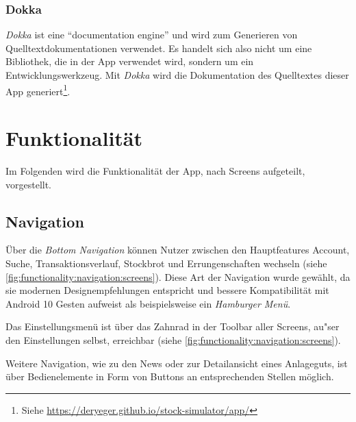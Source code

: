 \documentclass[a4paper]{article}
\begin{document}
\subsubsection{Dokka}
\label{subsubsec:technologies:bibs:dokka}
\textit{Dokka} ist eine "`documentation engine"' und wird zum Generieren von Quelltextdokumentationen verwendet.
Es handelt sich also nicht um eine Bibliothek, die in der App verwendet wird, sondern um ein Entwicklungswerkzeug.
Mit \textit{Dokka}  wird die Dokumentation des Quelltextes dieser App generiert\footnote{Siehe \url{https://deryeger.github.io/stock-simulator/app/}}.


\section{Funktionalität}
\label{sec:functionality}
Im Folgenden wird die Funktionalität der App, nach Screens aufgeteilt, vorgestellt.


\subsection{Navigation}
\label{subsec:functionality:navigation}
Über die \textit{Bottom Navigation} \autocite{bottom_navigation} können Nutzer zwischen den Hauptfeatures Account, Suche, Transaktionsverlauf, Stockbrot und Errungenschaften wechseln (siehe \autoref{fig:functionality:navigation:screens}).
Diese Art der Navigation wurde gewählt, da sie modernen Designempfehlungen entspricht und bessere Kompatibilität mit Android 10 Gesten aufweist als beispielsweise ein \textit{Hamburger Menü}.

Das Einstellungsmenü ist über das Zahnrad in der Toolbar aller Screens, au"ser den Einstellungen selbst, erreichbar (siehe \autoref{fig:functionality:navigation:screens}).

Weitere Navigation, wie zu den News oder zur Detailansicht eines Anlageguts, ist über Bedienelemente in Form von Buttons an entsprechenden Stellen möglich.
\end{document}
